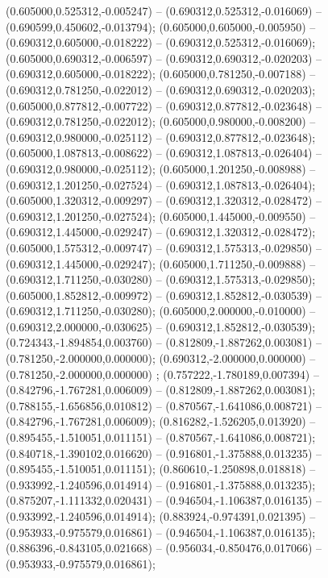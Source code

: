  (0.605000,0.525312,-0.005247) -- (0.690312,0.525312,-0.016069) -- (0.690599,0.450602,-0.013794);
 (0.605000,0.605000,-0.005950) -- (0.690312,0.605000,-0.018222) -- (0.690312,0.525312,-0.016069);
 (0.605000,0.690312,-0.006597) -- (0.690312,0.690312,-0.020203) -- (0.690312,0.605000,-0.018222);
 (0.605000,0.781250,-0.007188) -- (0.690312,0.781250,-0.022012) -- (0.690312,0.690312,-0.020203);
 (0.605000,0.877812,-0.007722) -- (0.690312,0.877812,-0.023648) -- (0.690312,0.781250,-0.022012);
 (0.605000,0.980000,-0.008200) -- (0.690312,0.980000,-0.025112) -- (0.690312,0.877812,-0.023648);
 (0.605000,1.087813,-0.008622) -- (0.690312,1.087813,-0.026404) -- (0.690312,0.980000,-0.025112);
 (0.605000,1.201250,-0.008988) -- (0.690312,1.201250,-0.027524) -- (0.690312,1.087813,-0.026404);
 (0.605000,1.320312,-0.009297) -- (0.690312,1.320312,-0.028472) -- (0.690312,1.201250,-0.027524);
 (0.605000,1.445000,-0.009550) -- (0.690312,1.445000,-0.029247) -- (0.690312,1.320312,-0.028472);
 (0.605000,1.575312,-0.009747) -- (0.690312,1.575313,-0.029850) -- (0.690312,1.445000,-0.029247);
 (0.605000,1.711250,-0.009888) -- (0.690312,1.711250,-0.030280) -- (0.690312,1.575313,-0.029850);
 (0.605000,1.852812,-0.009972) -- (0.690312,1.852812,-0.030539) -- (0.690312,1.711250,-0.030280);
 (0.605000,2.000000,-0.010000) -- (0.690312,2.000000,-0.030625) -- (0.690312,1.852812,-0.030539);
 (0.724343,-1.894854,0.003760) -- (0.812809,-1.887262,0.003081) -- (0.781250,-2.000000,0.000000);
 (0.690312,-2.000000,0.000000) -- (0.781250,-2.000000,0.000000) ;
 (0.757222,-1.780189,0.007394) -- (0.842796,-1.767281,0.006009) -- (0.812809,-1.887262,0.003081);
 (0.788155,-1.656856,0.010812) -- (0.870567,-1.641086,0.008721) -- (0.842796,-1.767281,0.006009);
 (0.816282,-1.526205,0.013920) -- (0.895455,-1.510051,0.011151) -- (0.870567,-1.641086,0.008721);
 (0.840718,-1.390102,0.016620) -- (0.916801,-1.375888,0.013235) -- (0.895455,-1.510051,0.011151);
 (0.860610,-1.250898,0.018818) -- (0.933992,-1.240596,0.014914) -- (0.916801,-1.375888,0.013235);
 (0.875207,-1.111332,0.020431) -- (0.946504,-1.106387,0.016135) -- (0.933992,-1.240596,0.014914);
 (0.883924,-0.974391,0.021395) -- (0.953933,-0.975579,0.016861) -- (0.946504,-1.106387,0.016135);
 (0.886396,-0.843105,0.021668) -- (0.956034,-0.850476,0.017066) -- (0.953933,-0.975579,0.016861);
